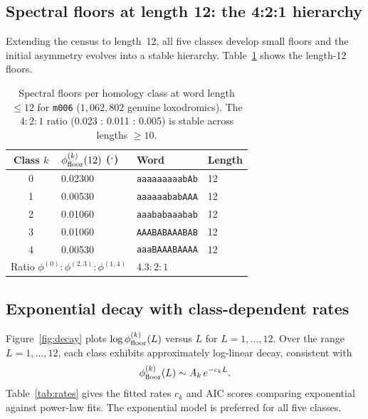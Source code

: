 \documentclass[12pt,a4paper]{article}
\newcommand{\mfld}[1]{\texttt{#1}}
\newcommand{\word}[1]{\texttt{#1}}
\newcommand{\degr}{^{\circ}}
\begin{document}
\subsection{Spectral floors at length 12: the 4:2:1 hierarchy}
Extending the census to length~12, all five classes develop small floors
and the initial asymmetry evolves into a stable hierarchy.
Table~\ref{tab:floors_L12} shows the length-12 floors.

\begin{table}[tp]
\caption{Spectral floors per homology class at word length $\leq 12$
  for \mfld{m006} ($1{,}062{,}802$ genuine loxodromics).
  The $4:2:1$ ratio (0.023 : 0.011 : 0.005) is stable across lengths
  $\geq 10$.}
\label{tab:floors_L12}
\begin{tabular}{clll}
\toprule
Class $k$ & $\phi_{\rm floor}^{(k)}(12)$ ($\degr$) & Word & Length \\
\midrule
0 & 0.02300 & \word{aaaaaaaaabAb} & 12 \\
1 & 0.00530 & \word{aaaaaababAAA} & 12 \\
2 & 0.01060 & \word{aaababaaabab} & 12 \\
3 & 0.01060 & \word{AAABABAAABAB} & 12 \\
4 & 0.00530 & \word{aaaBAAABAAAA} & 12 \\
\midrule
\multicolumn{2}{l}{Ratio $\phi^{(0)}:\phi^{(2,3)}:\phi^{(1,4)}$}
& \multicolumn{2}{l}{$4.3:2:1$} \\
\bottomrule
\end{tabular}
\end{table}

\subsection{Exponential decay with class-dependent rates}
Figure~\ref{fig:decay} plots $\log\phi_{\rm floor}^{(k)}(L)$ versus $L$
for $L=1,\ldots,12$.
Over the range $L=1,\ldots,12$, each class exhibits approximately log-linear decay, consistent with
\begin{equation}
  \phi_{\rm floor}^{(k)}(L) \sim A_k\,e^{-c_k L}.
  \label{eq:exp_decay}
\end{equation}
Table~\ref{tab:rates} gives the fitted rates $c_k$ and AIC scores
comparing exponential against power-law fits.
The exponential model is preferred for all five classes.
\end{document}

